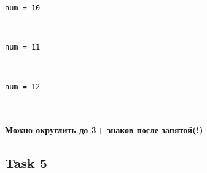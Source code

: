 \documentclass[11pt]{article}
\begin{document}
    \begin{Verbatim}[commandchars=\\\{\}]
num = 10

    \end{Verbatim}

    \begin{center}
    \end{center}
    { \hspace*{\fill} \\}
    
    \begin{Verbatim}[commandchars=\\\{\}]
num = 11

    \end{Verbatim}

    \begin{center}
    \end{center}
    { \hspace*{\fill} \\}
    
    \begin{Verbatim}[commandchars=\\\{\}]
num = 12

    \end{Verbatim}

    \begin{center}
    \end{center}
    { \hspace*{\fill} \\}
    
    \hypertarget{ux43cux43eux436ux43dux43e-ux43eux43aux440ux443ux433ux43bux438ux442ux44c-ux434ux43e-3-ux437ux43dux430ux43aux43eux432-ux43fux43eux441ux43bux435-ux437ux430ux43fux44fux442ux43eux439}{%
\paragraph{Можно округлить до 3+ знаков после
запятой(!)}\label{ux43cux43eux436ux43dux43e-ux43eux43aux440ux443ux433ux43bux438ux442ux44c-ux434ux43e-3-ux437ux43dux430ux43aux43eux432-ux43fux43eux441ux43bux435-ux437ux430ux43fux44fux442ux43eux439}}

    \hypertarget{task-5}{%
\subsection{Task 5}\label{task-5}}
\end{document}
